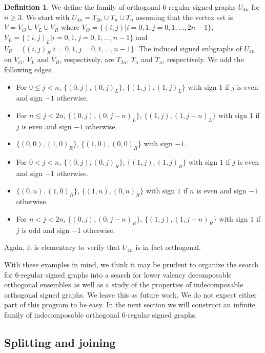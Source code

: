 \documentclass[11pt]{article}
\theoremstyle{plain}
\theoremstyle{definition}
\newtheorem{definition}[theorem]{Definition}
\begin{document}
\begin{definition}\label{defU8n}
We define the  family of orthogonal $6$-regular signed graphs $U_{4n}$ for $n\geqslant 3$.
We start with  $U_{4n}=T_{2n}\cup T_{n}\cup T_{n}$ assuming   that
the vertex set is $V=V_O\cup V_L\cup V_R$ where $V_O=\{(i,j) | i=0,1, j=0,1,\ldots,2n-1\}$,
$V_L=\{(i,j)_L | i=0,1, j=0,1,\ldots,n-1\}$ and $V_R=\{(i,j)_R | i=0,1, j=0,1,\ldots,n-1\}$.
The induced signed subgraphs of $U_{4n}$ on $V_O$,  $V_L$ and $V_R$, respectively, are  $T_{2n}$, $T_{n}$ and $T_{n}$, respectively.
We  add the following edges.
\begin{itemize}
\item[$\bullet$] For $0\leqslant j<n$,  $\{(0,j),(0,j )_L\}$,  $\{(1,j),(1,j)_L\}$  with sign $1$ if $j$ is even and sign  $-1$ otherwise.
\item[$\bullet$] For $n\leqslant j<2n$,  $\{(0,j),(0,j-n)_L\}$,  $\{(1,j),(1,j-n)_L\}$  with sign $1$ if $j$ is even and sign  $-1$ otherwise.
\item[$\bullet$] $\{(0,0),(1,0)_R\}$,  $\{(1,0),(0,0)_R\}$  with sign $-1$.
\item[$\bullet$] For $0<j<n$,  $\{(0,j),(0,j)_R\}$,  $\{(1,j),(1,j)_R\}$  with sign $1$ if $j$ is even and sign  $-1$ otherwise.
\item[$\bullet$] $\{(0,n),(1,0)_R\}$,  $\{(1,n),(0,n)_R\}$  with sign $1$ if $n$ is even and sign  $-1$ otherwise.
\item[$\bullet$] For $n<j<2n$,  $\{(0,j),(0,j-n)_R\}$,  $\{(1,j),(1,j-n)_R\}$  with sign $1$ if $j$ is odd and sign  $-1$ otherwise.
\end{itemize}
Again, it is elementary to verify that $U_{4n}$ is in fact orthogonal.
\end{definition}

With these examples in mind, we think it may be prudent to organize the search for $6$-regular signed graphs into a search for lower valency decomposable orthogonal ensembles as well as a study of the properties of indecomposable orthogonal signed graphs. We leave this as future work. We do not expect either part of this program to be easy. In the next section we will construct an infinite family of indecomposable orthogonal 6-regular signed graphs.






\subsection{Splitting and joining}
\end{document}
